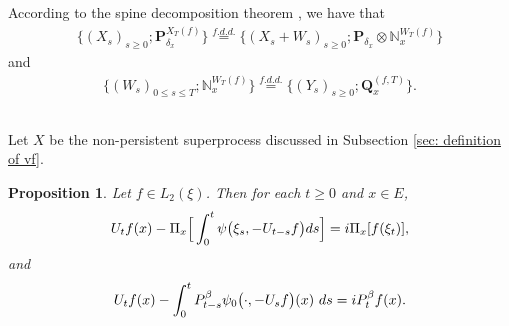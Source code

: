\documentclass[12pt,oneside,english]{amsart}
\theoremstyle{plain}
\newtheorem{prop}[thm]{Proposition}
\theoremstyle{definition}
\numberwithin{equation}{section}
\begin{document}
    According to the spine decomposition theorem \cite{RenSongSun2017Spine}, we have that
\begin{align}
\label{eq: Spine decomposition 1}
    \{(X_s)_{s \geq 0};\mathbf P_{\delta_x}^{X_T(f)}\}
    \overset{f.d.d.}{=} \{(X_s + W_s)_{s \geq 0};\mathbf P_{\delta_x} \otimes \mathbb N_x^{W_T(f)} \}
\end{align}
    and
\begin{align}
\label{eq: Spine decomposition 2}
    \{(W_s)_{0\leq s\leq T};\mathbb N_x^{W_T(f)}\}
    \overset{f.d.d.}{=} \{(Y_s)_{s \geq 0};\mathbf Q_x^{(f,T)}\}.
\end{align}
\subsection{}
    Let $X$ be the non-persistent superprocess discussed in Subsection \ref{sec: definition of vf}.

\begin{prop}
\label{prop: complex FKPP-equation}
    Let $f\in L_2(\xi)$. Then for each $t\geq 0$ and $x\in E$,
\begin{equation}
\label{eq: complex FKPP-equation}
    U_tf(x) - \Pi_x \Big[\int_0^t \psi\big(\xi_s, - U_{t-s}f\big) ds \Big]
    \\= i \Pi_x [f(\xi_t)],
\end{equation}
and
\begin{equation}
\label{eq: complex FKPP-equation with FK-transform}
    U_tf(x) -  \int_0^t P_{t-s}^{\beta} \psi_0\big(\cdot,-U_sf\big) (x)~ds
    \\= iP_t^\beta f(x).
\end{equation}
\end{prop}
\end{document}

